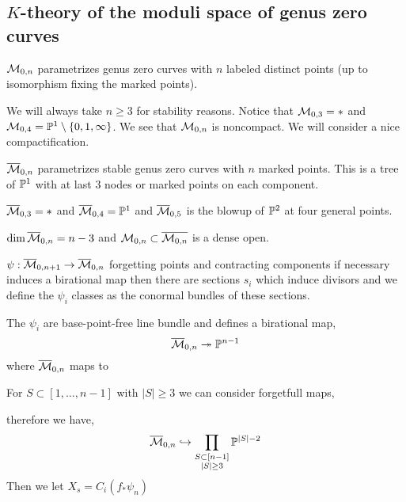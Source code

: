 \documentclass[12pt]{article}
\begin{document}
\subsection{$K$-theory of the moduli space of genus zero curves}


\begin{defn}
$\M_{0,n}$ parametrizes genus zero curves with $n$ labeled distinct points (up to isomorphism fixing the marked points). 
\end{defn}

\begin{rmk}
We will always take $n \ge 3$ for stability reasons. Notice that $\M_{0,3} = *$ and $\M_{0,4} = \P^1 \setminus \{ 0, 1, \infty \}$. We see that $\M_{0,n}$ is noncompact. We will consider a nice compactification. 
\end{rmk}

\begin{defn}
$\overline{\M}_{0,n}$ parametrizes stable genus zero curves with $n$ marked points. This is a tree of $\P^1$ with at last $3$ nodes or marked points on each component. 
\end{defn}

\begin{example}
$\overline{\M}_{0,3} = *$ and $\overline{\M}_{0,4} =  \P^1$ and $\overline{\M}_{0,5}$ is the blowup of $\P^2$ at four general points. 
\end{example}

\begin{prop}
$\dim{\overline{\M}_{0,n}} = n - 3$ and $\M_{0,n} \subset \overline{\M_{0,n}}$ is a dense open. 
\end{prop}

\begin{rmk}
$\psi : \overline{\M}_{0,n+1} \to \overline{\M}_{0,n}$ forgetting points and contracting components if necessary induces a birational map then there are sections $s_i$ which induce divisors and we define the $\psi_i$ classes as the conormal bundles of these sections.
\end{rmk}

\begin{thm}[Kapranov]
The $\psi_i$ are base-point-free line bundle and defines a birational map,
\[ \overline{\M}_{0,n} \onto \P^{n-1} \]
where $\overline{\M}_{0,n}$ maps to 
\end{thm}

\begin{rmk}
For $S \subset [1, \dots, n-1]$ with $|S| \ge 3$ we can consider forgetfull maps,
\begin{center}
\end{center}
therefore we have,
\[ \overline{\M}_{0,n} \embed \prod_{\substack{S \subset [n-1] \\ |S| \ge 3}} \P^{|S| - 2} \]
Then we let $X_s = C_i(f_* \psi_n)$ 
\end{rmk}
\end{document}
